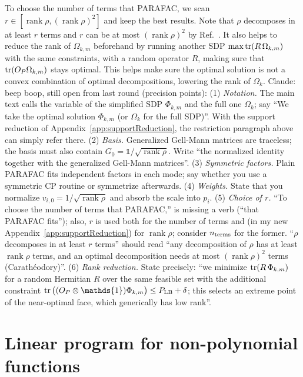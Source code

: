 \documentclass[aps,pra,twocolumn,showpacs,superscriptaddress,groupedaddress]{revtex4-2}
\newcommand{\one}[0]{\mathds{1}}
\newcommand{\claude}[1]{{\color{claudeorange} Claude: beep boop, #1}}
\newcommand{\I}{\one}
\begin{document}
\begin{widetext}
To choose the number of terms that PARAFAC, we scan $r \in [\operatorname{rank}\rho, (\operatorname{rank}\rho)^2]$ and keep the best results. Note that $\rho$ decomposes in at least $r$ terms and $r$ can be at most $(\operatorname{rank}\rho)^2$ by Ref.~\cite{CiteWho}. It also helps to reduce the rank of $\Omega_{k,m}$ beforehand by running another SDP $\max \tr(R \,\Omega_{k,m})$ with the same constraints, with a random operator $R$, making sure that $\tr(O_P \Omega_{k,m})$ stays optimal. This helps make sure the optimal solution is not a convex combination of optimal decompositions, lowering the rank of $\Omega_k$.
\claude{still open from last round (precision points): (1) \emph{Notation.} The main text calls the variable of the simplified SDP $\Phi_{k,m}$ and the full one $\Omega_k$; say ``We take the optimal solution $\Phi_{k,m}$ (or $\Omega_k$ for the full SDP)''. With the support reduction of Appendix~\ref{app:supportReduction}, the restriction paragraph above can simply refer there. (2) \emph{Basis.} Generalized Gell-Mann matrices are traceless; the basis must also contain $G_0=\I/\sqrt{\operatorname{rank}\rho}$. Write ``the normalized identity together with the generalized Gell-Mann matrices''. (3) \emph{Symmetric factors.} Plain PARAFAC fits independent factors in each mode; say whether you use a symmetric CP routine or symmetrize afterwards. (4) \emph{Weights.} State that you normalize $v_{i,0}=1/\sqrt{\operatorname{rank}\rho}$ and absorb the scale into $p_i$. (5) \emph{Choice of $r$.} ``To choose the number of terms that PARAFAC,'' is missing a verb (``that PARAFAC fits''); also, $r$ is used both for the number of terms and (in my new Appendix~\ref{app:supportReduction}) for $\operatorname{rank}\rho$; consider $n_{\rm terms}$ for the former. ``$\rho$ decomposes in at least $r$ terms'' should read ``any decomposition of $\rho$ has at least $\operatorname{rank}\rho$ terms, and an optimal decomposition needs at most $(\operatorname{rank}\rho)^2$ terms (Carath\'eodory)''. (6) \emph{Rank reduction.} State precisely: ``we minimize $\tr(R\,\Phi_{k,m})$ for a random Hermitian $R$ over the same feasible set with the additional constraint $\tr\big((O_P\otimes\I)\Phi_{k,m}\big)\leq P_{\rm LB}+\delta$; this selects an extreme point of the near-optimal face, which generically has low rank''.}


\section{Linear program for non-polynomial functions}\label{app:LP}


\end{widetext}
\end{document}
